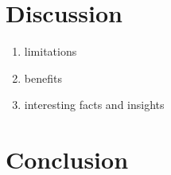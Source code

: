 \section{Discussion}
  \begin{enumerate}
    \item limitations
    \item benefits
    \item interesting facts and insights
  \end{enumerate}
 
 \section{Conclusion}
